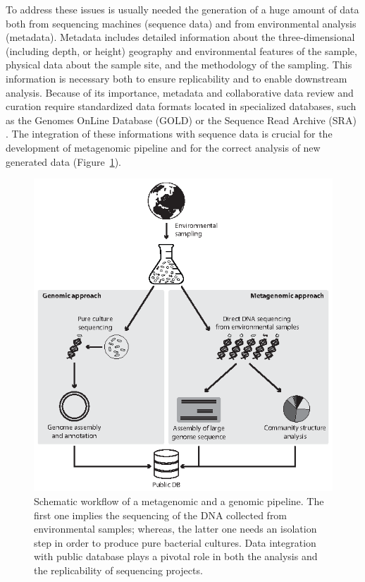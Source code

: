 To address these issues is usually needed the generation of a huge amount of data both from sequencing machines (sequence data) and from environmental analysis (metadata). Metadata includes detailed information about the three-dimensional (including depth, or height) geography and environmental features of the sample, physical data about the sample site, and the methodology of the sampling. This information is necessary both to ensure replicability and to enable downstream analysis. Because of its importance, metadata and collaborative data review and curation require standardized data formats located in specialized databases, such as the Genomes OnLine Database (GOLD) \cite{pagani2012genomes} or the Sequence Read Archive (SRA) \cite{leinonen2010sequence}. The integration of these informations with sequence data is crucial for the development of metagenomic pipeline and for the correct analysis of new generated data (Figure~\ref{fig:metapipe}).\\
\begin{figure}[!tb]
	\centering
	\includegraphics[width=1\textwidth]{./figures/Introduction/pipeline_mod}
  	\caption{Schematic workflow of a metagenomic and a genomic pipeline. The first one implies the sequencing of the DNA collected from environmental samples; whereas, the latter one needs an isolation step in order to produce pure bacterial cultures. Data integration with public database plays a pivotal role in both the analysis and the replicability of sequencing projects.
  	\label{fig:metapipe}}
\end{figure}


